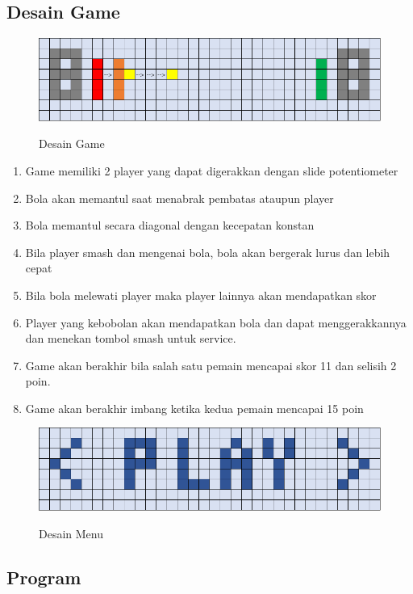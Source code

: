 \documentclass[a4paper,12pt]{article}
\begin{document}
\subsection{Desain Game}
\begin{figure}[h!]
    \centering
    \includegraphics[width=1\textwidth]{images/desain_game.png}
    \label{fig:desaingame}
    \caption{Desain Game}
\end{figure}
\begin{enumerate}
    \item Game memiliki 2 player yang dapat digerakkan dengan slide potentiometer
    \item Bola akan memantul saat menabrak pembatas ataupun player
    \item Bola memantul secara diagonal dengan kecepatan konstan
    \item Bila player smash dan mengenai bola, bola akan bergerak lurus dan lebih cepat
    \item Bila bola melewati player maka player lainnya akan mendapatkan skor
    \item Player yang kebobolan akan mendapatkan bola dan dapat menggerakkannya
        dan menekan tombol smash untuk service.
    \item Game akan berakhir bila salah satu pemain mencapai skor 11 dan selisih 2 poin.
    \item Game akan berakhir imbang ketika kedua pemain mencapai 15 poin
\end{enumerate}

\begin{figure}[h!]
    \centering
    \includegraphics[width=1\textwidth]{images/menu.png}
    \label{fig:desainmenu}
    \caption{Desain Menu}
\end{figure}

\subsection{Program}
\end{document}
